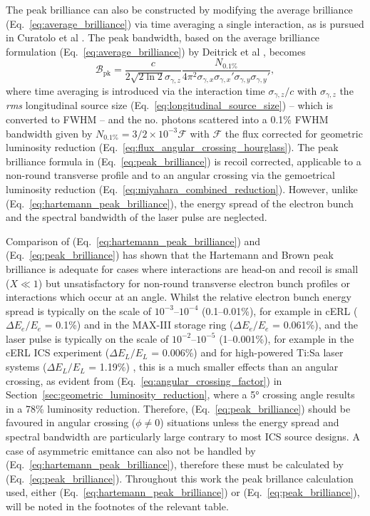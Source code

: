 \documentclass[../main.tex]{subfiles}
\begin{document}
The peak brilliance can also be constructed by modifying the average brilliance (Eq.~\ref{eq:average_brilliance}) via time averaging a single interaction, as is pursued in Curatolo et al \cite{curatolo2017analytical}. The peak bandwidth, based on the average brilliance formulation (Eq.~\ref{eq:average_brilliance}) by Deitrick et al \cite{deitrick2018high}, becomes
\begin{equation}
\mathcal{B}_{\mathrm{pk}} = \frac{c}{2\sqrt{2\ln2}\sigma_{\gamma,z}}\frac{N_{0.1\%}}{4\pi^{2}\sigma_{\gamma,x}\sigma_{\gamma,x}'\sigma_{\gamma,y}\sigma_{\gamma,y}'},
\label{eq:peak_brilliance}    
\end{equation}
where time averaging is introduced via the interaction time $\sigma_{\gamma,z}/c$ with $\sigma_{\gamma,z}$ the \textit{rms} longitudinal source size (Eq.~\ref{eq:longitudinal_source_size}) -- which is converted to FWHM -- and the no. photons scattered into a 0.1\% FWHM bandwidth given by $N_{0.1\%} = 3/2\times 10^{-3}\mathcal{F}$ with $\mathcal{F}$ the flux corrected for geometric luminosity reduction (Eq.~\ref{eq:flux_angular_crossing_hourglass}). The peak brilliance formula in (Eq.~\ref{eq:peak_brilliance}) is recoil corrected, applicable to a non-round transverse profile and to an angular crossing via the gemoetrical luminosity reduction (Eq.~\ref{eq:miyahara_combined_reduction}). However, unlike (Eq.~\ref{eq:hartemann_peak_brilliance}), the energy spread of the electron bunch and the spectral bandwidth of the laser pulse are neglected. 

Comparison of (Eq.~\ref{eq:hartemann_peak_brilliance}) and (Eq.~\ref{eq:peak_brilliance}) has shown that the Hartemann and Brown peak brilliance is adequate for cases where interactions are head-on and recoil is small ($X \ll 1$) but unsatisfactory for non-round transverse electron bunch profiles or interactions which occur at an angle. Whilst the relative electron bunch energy spread is typically on the scale of $10^{-3}$--$10^{-4}$ (0.1--0.01\%), for example in cERL \cite{akagi2016narrow} ($\Delta E_{e}/E_{e}$ = 0.1\%) and in the MAX-III storage ring \cite{sjostrom2009max} ($\Delta E_{e}/E_{e}$ = 0.061\%), and the laser pulse is typically on the scale of $10^{-2}$--$10^{-5}$ (1--0.001\%), for example in the cERL ICS experiment ($\Delta E_{L}/E_{L}$ = 0.006\%) \cite{akagi2016narrow} and for high-powered Ti:Sa laser systems ($\Delta E_{L}/E_{L}$ = 1.19\%) \cite{liu2021review}, this is a much smaller effects than an angular crossing, as evident from (Eq.~\ref{eq:angular_crossing_factor}) in Section~\ref{sec:geometric_luminosity_reduction}, where a 5\si{\degree} crossing angle results in a 78\% luminosity reduction. Therefore, (Eq.~\ref{eq:peak_brilliance}) should be favoured in angular crossing ($\phi\neq 0$) situations unless the energy spread and spectral bandwidth are particularly large contrary to most ICS source designs. A case of asymmetric emittance can also not be handled by (Eq.~\ref{eq:hartemann_peak_brilliance}), therefore these must be calculated by (Eq.~\ref{eq:peak_brilliance}). Throughout this work the peak brillance calculation used, either (Eq.~\ref{eq:hartemann_peak_brilliance}) or (Eq.~\ref{eq:peak_brilliance}), will be noted in the footnotes of the relevant table.  
\end{document}
